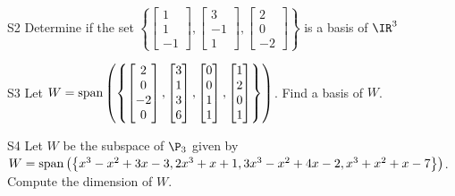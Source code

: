 \documentclass{sbgLAexam}
\begin{document}
\begin{problem}{S2}
Determine if the set $\left\{\begin{bmatrix} 1 \\ 1 \\ -1 \end{bmatrix}, \begin{bmatrix} 3 \\ -1 \\ 1 \end{bmatrix},\begin{bmatrix} 2 \\ 0 \\ -2 \end{bmatrix}\right\}$ is a basis of $\IR^3$
\end{problem}

\begin{problem}{S3}
Let $W={\rm span}\left(\left\{\begin{bmatrix} 2 \\ 0 \\ -2 \\ 0 \end{bmatrix}, \begin{bmatrix} 3 \\ 1 \\ 3 \\ 6 \end{bmatrix}, \begin{bmatrix} 0 \\ 0 \\ 1 \\ 1 \end{bmatrix}, \begin{bmatrix}1 \\ 2 \\ 0 \\ 1 \end{bmatrix}\right\}\right)$.  Find a basis of $W$.
\end{problem}

\begin{problem}{S4}
Let $W$ be the subspace of $\P_3$ given by $W={\rm span}\left( \left\{ x^3-x^2+3x-3, 2x^3+x+1, 3x^3-x^2+4x-2, x^3+x^2+x-7\right\}\right)$.  Compute the dimension of $W$.
\end{problem}
\end{document}
